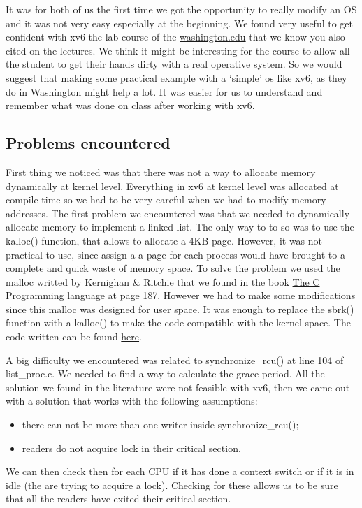 \documentclass[10pt,a4]{article}
\begin{document}
It was for both of us the first time we got the opportunity to really modify an OS and it was not very easy especially at the beginning. We found very useful to get confident with xv6 the lab course of the \href{https://courses.cs.washington.edu/courses/csep551/19au/labs/}{washington.edu} that we know you also cited on the lectures. We think it might be interesting for the course to allow all the student to get their hands dirty with a real operative system. So we would suggest that making some practical example with a ‘simple’ os like xv6, as they do in Washington might  help a lot. It was easier for us to understand and remember what was done on class after working with xv6.

\subsection{Problems encountered}

First thing we noticed was that there was not a way to allocate memory dynamically at kernel level. Everything in xv6 at kernel level was allocated at compile time so we had to be very careful when we had to modify memory addresses. The first problem we encountered was that we needed to dynamically allocate memory to implement a linked list. The only way to to so was to use the kalloc() function, that allows to allocate a 4KB page. However, it was not practical to use, since assign a a page for each process would have brought to a complete and quick waste of memory space. To solve the problem we used the malloc writted by Kernighan \& Ritchie that we found in the book \href{https://kremlin.cc/k&r.pdf}{The C Programming language} at page 187. However we had to make some modifications since this malloc was designed for user space. It was enough to replace the sbrk() function with a kalloc() to make the code compatible with the kernel space. The code written can be found \href{https://github.com/salvoM/xv6-riscv-rcu/blob/final/kernel/kmalloc.c}{here}.

A big difficulty we encountered was related to \href{https://github.com/salvoM/xv6-riscv-rcu/blob/final/kernel/list_proc.c}{synchronize\_rcu()} at line 104 of list\_proc.c. We needed to find a way to calculate the grace period. All the solution we found in the literature were not feasible with xv6, then we came out with a solution that works with the following assumptions:
\begin{itemize}
    \item there can not be more than one writer inside synchronize\_rcu();
    \item readers do not acquire lock in their critical section.
\end{itemize}
We can then check then for each CPU if it has done a context switch or if it is in idle (the are trying to acquire a lock). 
Checking for these allows us to be sure that all the readers have exited their critical section.
\end{document}

